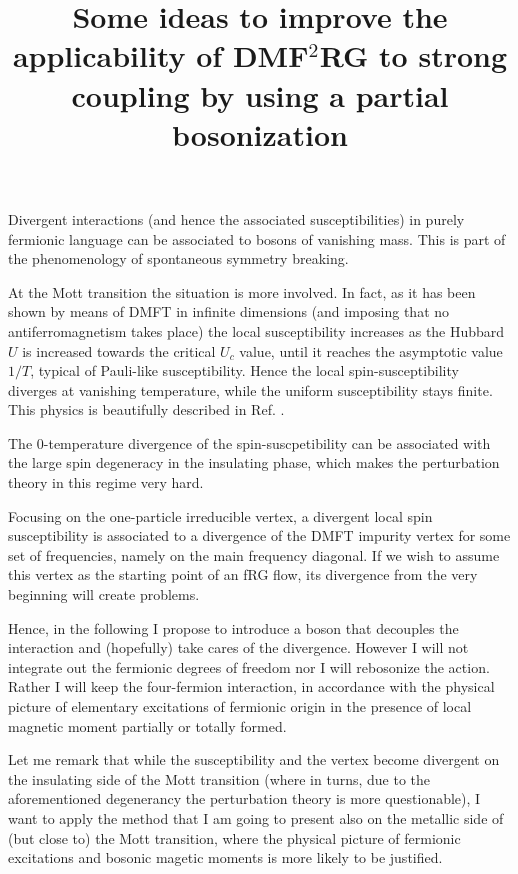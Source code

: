 \documentclass[a4paper,11pt]{article}
\author{}
\title{{\bf Some ideas to improve the applicability of DMF$^2$RG to strong coupling by using a partial bosonization }}
\begin{document}
\maketitle

Divergent interactions (and hence the associated susceptibilities) in purely fermionic language can be associated to bosons of vanishing mass. 
This is part of the phenomenology of spontaneous symmetry breaking. 


At the Mott transition the situation is more involved. In fact, as it has been shown by means of DMFT in infinite dimensions (and imposing that no antiferromagnetism takes place) the local susceptibility increases as the Hubbard $U$ is increased towards the critical $U_c$ value, until it reaches the asymptotic value $1/T$, typical of Pauli-like susceptibility. Hence the local spin-susceptibility diverges at vanishing temperature, while the uniform susceptibility stays finite. This physics is beautifully described in Ref. \cite{Georges1996}. 

The $0$-temperature divergence of the spin-suscpetibility  can be associated with the large spin degeneracy in the insulating phase, which makes the perturbation theory in this regime very hard. 

Focusing on the one-particle irreducible vertex, a divergent local spin susceptibility is associated to a divergence of the DMFT impurity vertex for some set of frequencies, namely on the main frequency diagonal. 
If we wish to assume this vertex as the starting point of an fRG flow,  its divergence from the very beginning will create problems.  

Hence, in the following I propose to introduce a boson that decouples the interaction and (hopefully) take cares of the divergence. 
However I will not integrate out the fermionic degrees of freedom nor I will rebosonize the action. 
Rather I will keep the four-fermion interaction, in accordance with the physical picture of elementary excitations of fermionic origin in the presence of local magnetic moment partially or totally formed. 

Let me remark that while the susceptibility and the vertex become divergent on the insulating side of the Mott transition (where in turns, due to the aforementioned degenerancy the perturbation theory is more questionable), I want to apply the method that I am going to present also on the metallic side of (but close to) the Mott transition, where the physical picture of fermionic excitations and bosonic magetic moments  is more likely to be justified. 
\end{document}
